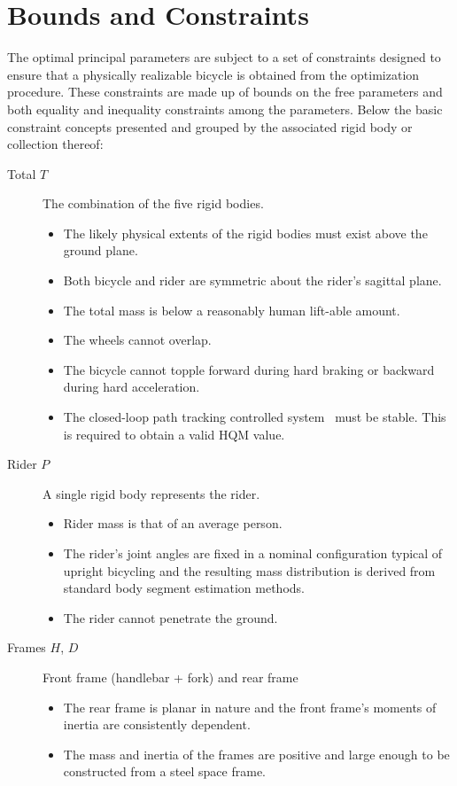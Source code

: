 \documentclass{bmd2019p}
\begin{document}
\section{Bounds and Constraints}
%
The optimal principal parameters are subject to a set of constraints designed
to ensure that a physically realizable bicycle is obtained from the
optimization procedure. These constraints are made up of bounds on the free
parameters and both equality and inequality constraints among the parameters.
Below the basic constraint concepts presented and grouped by the associated
rigid body or collection thereof:
%
\begin{description}
  \item[Total $T$] The combination of the five rigid bodies.
    \begin{itemize}
      \item The likely physical extents of the rigid bodies must exist above
        the ground plane.
      \item Both bicycle and rider are symmetric about the rider's sagittal
        plane.
      \item The total mass is below a reasonably human lift-able amount.
      \item The wheels cannot overlap.
      \item The bicycle cannot topple forward during hard braking or backward
        during hard acceleration.
      \item The closed-loop path tracking controlled system~\cite{Hess2012}
        must be stable. This is required to obtain a valid HQM value.
    \end{itemize}

  \item[Rider $P$] A single rigid body represents the rider.
    \begin{itemize}
      \item Rider mass is that of an average person.
      \item The rider's joint angles are fixed in a nominal configuration
        typical of upright bicycling and the resulting mass distribution is
        derived from standard body segment estimation methods.
      \item The rider cannot penetrate the ground.
    \end{itemize}

  \item[Frames $H$, $D$] Front frame (handlebar + fork) and rear frame
    \begin{itemize}
      \item The rear frame is planar in nature and the front frame's moments of
        inertia are consistently dependent.
      \item The mass and inertia of the frames are positive and large enough to
        be constructed from a steel space frame.
    \end{itemize}


\end{description}
\end{document}
